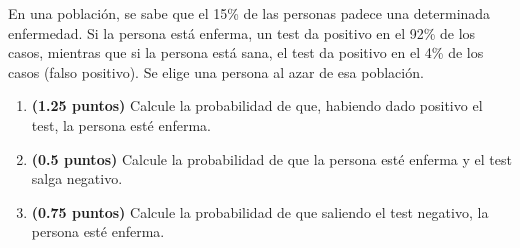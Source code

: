
En una población, se sabe que el 15\% de las personas padece una determinada
enfermedad. Si la persona está enferma, un test da positivo en el 92\% de los
casos, mientras que si la persona está sana, el test da positivo en el 4\%
de los casos (falso positivo). Se elige una persona al azar de esa población.
\begin{enumerate}[label=\alph*)]
  \item \textbf{(1.25 puntos)} Calcule la probabilidad de que, habiendo dado
  positivo el test, la persona esté enferma.
  \item \textbf{(0.5 puntos)} Calcule la probabilidad de que la persona esté
  enferma y el test salga negativo.
  \item \textbf{(0.75 puntos)} Calcule la probabilidad de que saliendo el
  test negativo, la persona esté enferma.
\end{enumerate}
